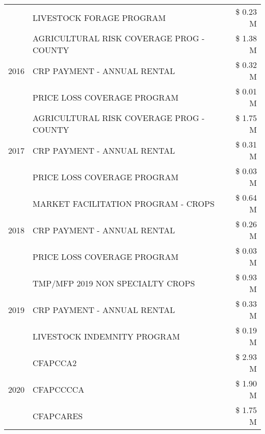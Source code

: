 \begin{tabular}{llr}
 & LIVESTOCK FORAGE PROGRAM & \$ 0.23 M \\
\cline{1-3}
\multirow[t]{3}{*}{2016} & AGRICULTURAL RISK COVERAGE PROG - COUNTY & \$ 1.38 M \\
 & CRP PAYMENT - ANNUAL RENTAL & \$ 0.32 M \\
 & PRICE LOSS COVERAGE PROGRAM & \$ 0.01 M \\
\cline{1-3}
\multirow[t]{3}{*}{2017} & AGRICULTURAL RISK COVERAGE PROG - COUNTY & \$ 1.75 M \\
 & CRP PAYMENT - ANNUAL RENTAL & \$ 0.31 M \\
 & PRICE LOSS COVERAGE PROGRAM & \$ 0.03 M \\
\cline{1-3}
\multirow[t]{3}{*}{2018} & MARKET FACILITATION PROGRAM - CROPS & \$ 0.64 M \\
 & CRP PAYMENT - ANNUAL RENTAL & \$ 0.26 M \\
 & PRICE LOSS COVERAGE PROGRAM & \$ 0.03 M \\
\cline{1-3}
\multirow[t]{3}{*}{2019} & TMP/MFP 2019 NON SPECIALTY CROPS & \$ 0.93 M \\
 & CRP PAYMENT - ANNUAL RENTAL & \$ 0.33 M \\
 & LIVESTOCK INDEMNITY PROGRAM & \$ 0.19 M \\
\cline{1-3}
\multirow[t]{3}{*}{2020} & CFAPCCA2 & \$ 2.93 M \\
 & CFAPCCCCA & \$ 1.90 M \\
 & CFAPCARES & \$ 1.75 M \\
\cline{1-3}
\bottomrule
\end{tabular}
